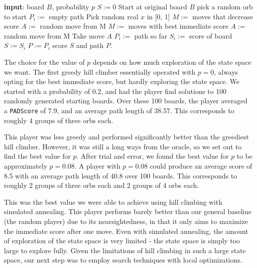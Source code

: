 \documentclass[journal,final,letterpaper,11pt]{IEEEtran}
\begin{document}
\begin{algorithmic}[1]
\STATE \textbf{input}: board $B$, probability $p$
\STATE $S := 0$
  \STATE Start at original board $B$
  \STATE pick a random orb to start
  \STATE $P_i :=$ empty path
    \STATE Pick random real $x$ in [0, 1]
      \STATE $M :=$ moves that decrease score
      \STATE $A :=$ random move from M
    \ENDIF
      \STATE $M :=$ moves with best immediate score
      \STATE $A :=$ random move from M
    \ENDIF
    \STATE Take move $A$
    \STATE $P_i :=$ path so far
  \ENDFOR
  \STATE $S_i :=$ score of board
    \STATE $S := S_i$
    \STATE $P := P_i$
  \ENDIF
\ENDFOR
\RETURN score $S$ and path $P$.
\end{algorithmic}

The choice for the value of $p$ depends on how much exploration of the state space we want. The first greedy hill climber essentially operated with $p=0$, always opting for the best immediate score, but hardly exploring the state space. We started with a probability of 0.2, and had the player find solutions to 100 randomly generated starting boards. Over these 100 boards, the player averaged a \texttt{PADScore} of 7.9, and an average path length of 38.57. This corresponds to roughly 4 groups of three orbs each.

This player was less greedy and performed significantly better than the greediest hill climber. However, it was still a long ways from the oracle, so we set out to find the best value for $p$. After trial and error, we found the best value for $p$ to be approximately $p=0.08$. A player with $p=0.08$ could produce an average score of 8.5 with an average path length of 40.8 over 100 boards. This corresponds to roughly 2 groups of three orbs each and 2 groups of 4 orbs each.

This was the best value we were able to achieve using hill climbing with simulated annealing. This player performs barely better than our general baseline (the random player) due to its nearsightedness, in that it only aims to maximize the immediate score after one move. Even with simulated annealing, the amount of exploration of the state space is very limited - the state space is simply too large to explore fully. Given the limitations of hill climbing in such a large state space, our next step was to employ search techniques with local optimizations.
\end{document}
